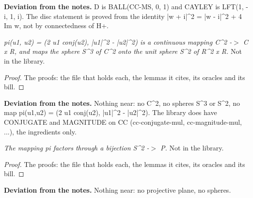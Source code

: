 \noindent\textbf{Deviation from the notes.} D is BALL(CC-MS, 0, 1) and CAYLEY is LFT(1, -i, 1, i). The disc statement is proved from the identity |w + i|\textasciicircum{}2 = |w - i|\textasciicircum{}2 + 4 Im w, not by connectedness of H+.
%
\renewcommand{\thethm}{1.22}
\begin{prop}\label{thm:complex-analysis-1.22}
%
\textit{pi(u1, u2) = (2 u1 conj(u2), |u1|\textasciicircum{}2 - |u2|\textasciicircum{}2) is a continuous mapping C\textasciicircum{}2 -$>$ C x R, and maps the sphere S\textasciicircum{}3 of C\textasciicircum{}2 onto the unit sphere S\textasciicircum{}2 of R\textasciicircum{}2 x R.}
%
Not in the library.
%
\end{prop}
%
\begin{proof}
%
The proofs: the file that holds each, the lemmas it cites, its oracles and its bill.
%
%
\end{proof}
%
\noindent\textbf{Deviation from the notes.} Nothing near: no C\textasciicircum{}2, no spheres S\textasciicircum{}3 or S\textasciicircum{}2, no map pi(u1,u2) = (2 u1 conj(u2), |u1|\textasciicircum{}2 - |u2|\textasciicircum{}2). The library does have CONJUGATE and MAGNITUDE on CC (cc-conjugate-mul, cc-magnitude-mul, ...), the ingredients only.
%
\renewcommand{\thethm}{1.24}
\begin{cor}\label{thm:complex-analysis-1.24}
%
\textit{The mapping pi factors through a bijection S\textasciicircum{}2 -$>$ P.}
%
Not in the library.
%
\end{cor}
%
\begin{proof}
%
The proofs: the file that holds each, the lemmas it cites, its oracles and its bill.
%
%
\end{proof}
%
\noindent\textbf{Deviation from the notes.} Nothing near: no projective plane, no spheres.
%
\renewcommand{\thethm}{2.2}
\begin{prop}\label{thm:diff-on-implies-continuous}
%
%
\end{prop}
